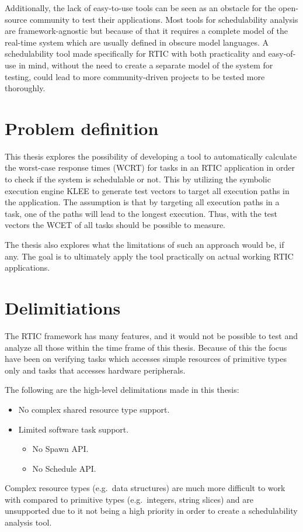 Additionally, the lack of easy-to-use tools can be seen as an obstacle for the
open-source community to test their applications. Most tools for schedulability
analysis are framework-agnostic but because of that it requires a complete
model of the real-time system which are usually defined in obscure model
languages. A schedulability tool made specifically for RTIC with both
practicality and easy-of-use in mind, without the need to create a separate
model of the system for testing, could lead to more community-driven projects
to be tested more thoroughly.

\section{Problem definition}
This thesis explores the possibility of developing a tool to automatically
calculate the worst-case response times (WCRT) for tasks in an RTIC application
in order to check if the system is schedulable or not. This by utilizing the
symbolic execution engine KLEE to generate test vectors to target all execution
paths in the application. The assumption is that by targeting all execution
paths in a task, one of the paths will lead to the longest execution. Thus,
with the test vectors the WCET of all tasks should be possible to measure.

The thesis also explores what the limitations of such an approach would be, if
any. The goal is to ultimately apply the tool practically on actual working
RTIC applications.

\section{Delimitiations}
The RTIC framework has many features, and it would not be possible to test and
analyze all those within the time frame of this thesis. Because of this the
focus have been on verifying tasks which accesses simple resources of primitive
types only and tasks that accesses hardware peripherals.

The following are the high-level delimitations made in this thesis:
\begin{itemize}
    \item No complex shared resource type support.
    \item Limited software task support.
    \begin{itemize}
        \item No Spawn API\@.
        \item No Schedule API\@.
    \end{itemize}
\end{itemize}
Complex resource types (e.g.\ data structures) are much more difficult to work
with compared to primitive types (e.g.\ integers, string slices) and are
unsupported due to it not being a high priority in order to create a
schedulability analysis tool.


